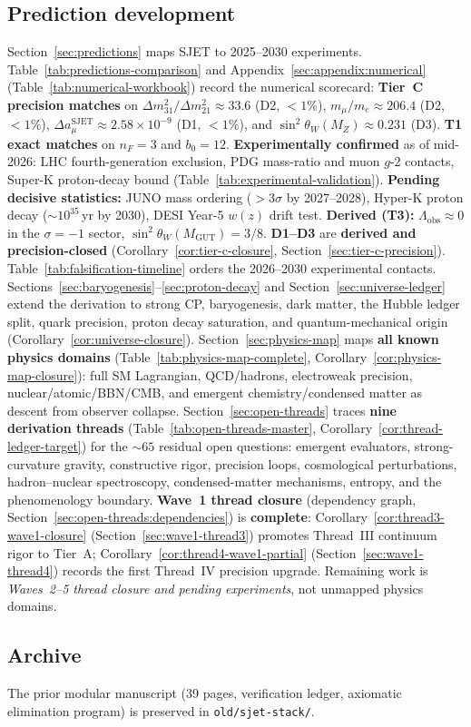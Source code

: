 \subsection{Prediction development}

Section~\ref{sec:predictions} maps SJET to 2025--2030 experiments.
Table~\ref{tab:predictions-comparison} and Appendix~\ref{sec:appendix:numerical}
(Table~\ref{tab:numerical-workbook}) record the numerical scorecard:
\textbf{Tier~C precision matches} on $\Delta m^2_{31}/\Delta m^2_{21}\approx
33.6$ (D2, $<1\%$), $m_\mu/m_e\approx206.4$ (D2, $<1\%$),
$\Delta a_\mu^{\mathrm{SJET}}\approx2.58\times10^{-9}$ (D1, $<1\%$), and
$\sin^2\theta_W(M_Z)\approx0.231$ (D3). \textbf{T1 exact matches} on
$n_F=3$ and $b_0=12$. \textbf{Experimentally confirmed} as of mid-2026:
LHC fourth-generation exclusion, PDG mass-ratio and muon $g$-2 contacts,
Super-K proton-decay bound (Table~\ref{tab:experimental-validation}).
\textbf{Pending decisive statistics:} JUNO mass ordering ($>3\sigma$ by
2027--2028), Hyper-K proton decay ($\sim10^{35}$\,yr by 2030), DESI
Year-5 $w(z)$ drift test. \textbf{Derived (T3):} $\Lambda_{\mathrm{obs}}
\approx 0$ in the $\sigma=-1$ sector, $\sin^2\theta_W(M_{\mathrm{GUT}})=3/8$.
\textbf{D1--D3} are \textbf{derived and precision-closed}
(Corollary~\ref{cor:tier-c-closure}, Section~\ref{sec:tier-c-precision}).
Table~\ref{tab:falsification-timeline} orders the 2026--2030 experimental
contacts. Sections~\ref{sec:baryogenesis}--\ref{sec:proton-decay} and
Section~\ref{sec:universe-ledger} extend the derivation to strong CP,
baryogenesis, dark matter, the Hubble ledger split, quark precision, proton
decay saturation, and quantum-mechanical origin
(Corollary~\ref{cor:universe-closure}).
Section~\ref{sec:physics-map} maps \textbf{all known physics domains}
(Table~\ref{tab:physics-map-complete}, Corollary~\ref{cor:physics-map-closure}):
full SM Lagrangian, QCD/hadrons, electroweak precision, nuclear/atomic/BBN/CMB,
and emergent chemistry/condensed matter as descent from observer collapse.
Section~\ref{sec:open-threads} traces \textbf{nine derivation threads}
(Table~\ref{tab:open-threads-master}, Corollary~\ref{cor:thread-ledger-target})
for the $\sim 65$ residual open questions: emergent evaluators, strong-curvature
gravity, constructive rigor, precision loops, cosmological perturbations,
hadron--nuclear spectroscopy, condensed-matter mechanisms, entropy, and the
phenomenology boundary. \textbf{Wave~1 thread closure} (dependency graph,
Section~\ref{sec:open-threads:dependencies}) is \textbf{complete}:
Corollary~\ref{cor:thread3-wave1-closure} (Section~\ref{sec:wave1-thread3})
promotes Thread~III continuum rigor to Tier~A; Corollary~\ref{cor:thread4-wave1-partial}
(Section~\ref{sec:wave1-thread4}) records the first Thread~IV precision upgrade.
Remaining work is \emph{Waves~2--5 thread closure and pending experiments}, not
unmapped physics domains.

\subsection{Archive}

The prior modular manuscript (39 pages, verification ledger, axiomatic
elimination program) is preserved in \texttt{old/sjet-stack/}.